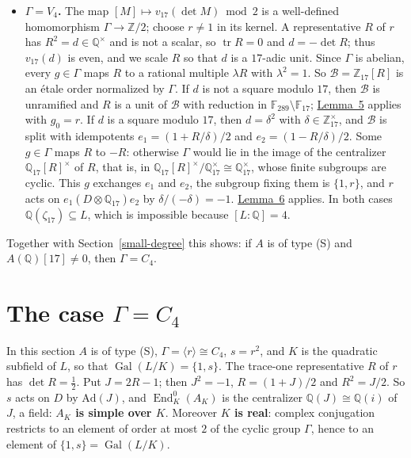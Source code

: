 \documentclass[11pt]{article}
\newcommand{\Q}{\mathbb Q}
\newcommand{\Z}{\mathbb Z}
\newcommand{\F}{\mathbb F}
\DeclareMathOperator{\End}{End}
\DeclareMathOperator{\Gal}{Gal}
\DeclareMathOperator{\tr}{tr}
\begin{document}
\begin{itemize}
\item \textbf{\(\Gamma=V_4\).} The map \([M]\mapsto v_{17}(\det M)\bmod2\) is a well-defined
homomorphism \(\Gamma\to\Z/2\); choose \(r\neq1\) in its kernel. A representative \(R\) of \(r\)
has \(R^2=d\in\Q^\times\) and is not a scalar, so \(\tr R=0\) and \(d=-\det R\); thus
\(v_{17}(d)\) is even, and we scale \(R\) so that \(d\) is a \(17\)-adic unit. Since \(\Gamma\) is
abelian, every \(g\in\Gamma\) maps \(R\) to a rational multiple \(\lambda R\) with
\(\lambda^2=1\). So \(\mathcal B=\Z_{17}[R]\) is an \'etale order normalized by \(\Gamma\). If \(d\) is not
a square modulo \(17\), then \(\mathcal B\) is unramified and \(R\) is a unit of \(\mathcal B\) with reduction in
\(\F_{289}\setminus\F_{17}\); \hyperref[lemma-unram]{Lemma~5} applies with \(g_0=r\). If \(d\) is
a square modulo \(17\), then \(d=\delta^2\) with \(\delta\in\Z_{17}^\times\), and \(\mathcal B\) is split with
idempotents \(e_1=(1+R/\delta)/2\) and \(e_2=(1-R/\delta)/2\). Some \(g\in\Gamma\) maps \(R\) to \(-R\):
otherwise \(\Gamma\) would lie in the image of the centralizer \(\Q_{17}[R]^\times\) of \(R\),
that is, in \(\Q_{17}[R]^\times/\Q_{17}^\times\cong\Q_{17}^\times\), whose finite subgroups are
cyclic. This \(g\) exchanges \(e_1\) and \(e_2\), the subgroup fixing them is \(\{1,r\}\), and
\(r\) acts on \(e_1(D\otimes\Q_{17})e_2\) by \(\delta/(-\delta)=-1\). \hyperref[lemma-split]{Lemma~6}
applies. In both cases \(\Q(\zeta_{17})\subseteq L\), which is impossible because
\([L:\Q]=4\).
\end{itemize}

Together with Section~\ref{small-degree} this shows: if \(A\) is of type (S) and
\(A(\Q)[17]\neq0\), then \(\Gamma=C_4\).

\section{The case \(\Gamma=C_4\)}\label{c4}

In this section \(A\) is of type (S), \(\Gamma=\langle r\rangle\cong C_4\), \(s=r^2\), and \(K\)
is the quadratic subfield of \(L\), so that \(\Gal(L/K)=\{1,s\}\). The trace-one representative
\(R\) of \(r\) has \(\det R=\tfrac12\). Put \(J=2R-1\); then \(J^2=-1\), \(R=(1+J)/2\) and
\(R^2=J/2\). So \(s\) acts on \(D\) by \(\mathrm{Ad}(J)\), and \(\End^0_K(A_K)\) is the
centralizer \(\Q(J)\cong\Q(i)\) of \(J\), a field: \textbf{\(A_K\) is simple over \(K\)}.
Moreover \textbf{\(K\) is real}: complex conjugation restricts to an element of order at most
\(2\) of the cyclic group \(\Gamma\), hence to an element of \(\{1,s\}=\Gal(L/K)\).
\end{document}
